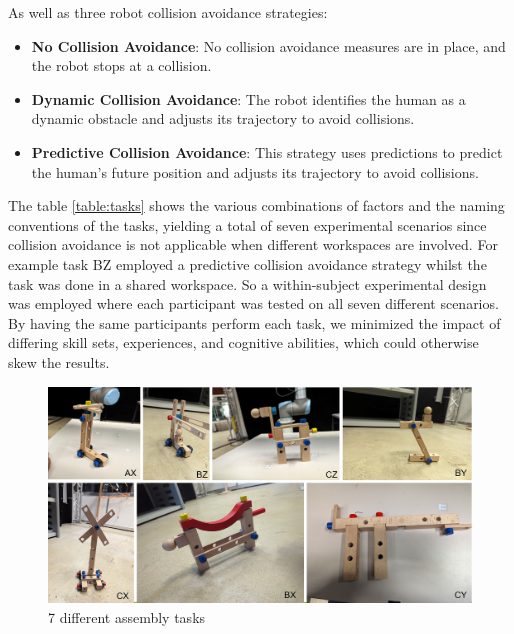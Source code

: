 As well as three robot collision avoidance strategies:

\begin{itemize}
    \item \textbf{No Collision Avoidance}:
    No collision avoidance measures are in place, and the robot stops at a collision.
    
    \item \textbf{Dynamic Collision Avoidance}:
    The robot identifies the human as a dynamic obstacle and adjusts its trajectory to avoid collisions.
    
    \item \textbf{Predictive Collision Avoidance}:
    This strategy uses predictions to predict the human's future position and adjusts its trajectory to avoid collisions.
\end{itemize}

The table \ref{table:tasks} shows the various combinations of factors and the naming conventions of the tasks, yielding a total of seven experimental scenarios since collision avoidance is not applicable when different workspaces are involved. For example task BZ employed a predictive collision avoidance strategy whilst the task was done in a shared workspace. So a within-subject experimental design was employed where each participant was tested on all seven different scenarios. By having the same participants perform each task, we minimized the impact of differing skill sets, experiences, and cognitive abilities, which could otherwise skew the results.

\begin{figure}[h]
	\centering
	\includegraphics[width=0.8\columnwidth]{images/7tasks.png}
	\caption{7 different assembly tasks}
	\label{fig:task}
\end{figure}


